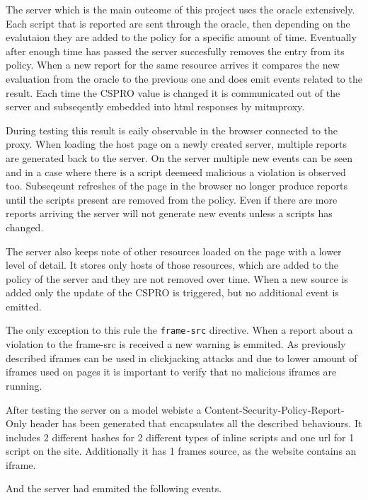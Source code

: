 \begin{description}
The server which is the main outcome of this project uses the oracle extensively.
Each script that is reported are sent through the oracle, then depending on the evalutaion they are added to the policy for a specific amount of time.
Eventually after enough time has passed the server succesfully removes the entry from its policy.
When a new report for the same resource arrives it compares the new evaluation from the oracle to the previous one and does emit events related to the result.
Each time the CSPRO value is changed it is communicated out of the server and subseqently embedded into html responses by mitmproxy.

During testing this result is eaily observable in the browser connected to the proxy.
When loading the host page on a newly created server, multiple reports are generated back to the server.
On the server multiple new events can be seen and in a case where there is a script deemeed malicious a violation is observed too.
Subseqeunt refreshes of the page in the browser no longer produce reports until the scripts present are removed from the policy.
Even if there are more reports arriving the server will not generate new events unless a scripts has changed.

The server also keeps note of other resources loaded on the page with a lower level of detail.
It stores only hosts of those resources, which are added to the policy of the server and they are not removed over time.
When a new source is added only the update of the CSPRO is triggered, but no additional event is emitted.

The only exception to this rule the \texttt{frame-src} directive. 
When a report about a violation to the frame-src is received a new warning is emmited.
As previously described iframes can be used in clickjacking attacks and due to lower amount of iframes used on pages it is important to verify that no malicious iframes are running.

After testing the server on a model webiste a Content-Security-Policy-Report-Only header has been generated that encapsulates all the described behaviours.
It includes 2 different hashes for 2 different types of inline scripts and one url for 1 script on the site.
Additionally it has 1 frames source, as the website contains an iframe.



And the server had emmited the following events.




\end{description}
